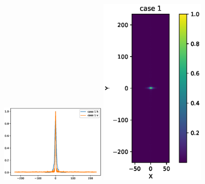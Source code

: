 \documentclass{iucr}              %
\begin{document}
\begin{figure}\label{fig:2DWofry1D}
    \centering

    
    \includegraphics[width=0.45\textwidth]{figures/case_1_profiles.eps}
    \includegraphics[width=0.45\textwidth]{figures/case_1_image.eps}
 

\end{figure}
\end{document}
